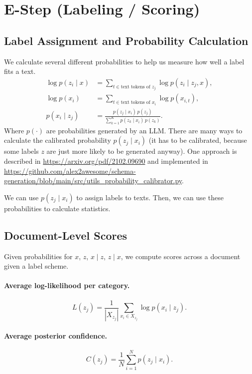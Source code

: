 \documentclass[11pt]{article}
\begin{document}
\section{E-Step (Labeling / Scoring)}

\subsection{Label Assignment and Probability Calculation}
We calculate several different probabilities to help us measure how well a label fits a text.
\begin{align}
\log p(z_i \mid x) &= \sum_{t \in \text{text tokens of } z_j} \log p(z_i \mid z_j, x), \tag{1} \\
\log p(x_i) &= \sum_{t \in \text{text tokens of } x_i} \log p(x_{i,t}), \tag{2} \\
p(x_i \mid z_j) &= \frac{p(z_j \mid x_i)\, p(z_j)}{\sum_{k=1}^K p(z_k \mid x_i)\, p(z_k)}. \tag{3}
\end{align}
Where $p(\cdot)$ are probabilities generated by an LLM. There are many ways to calculate the calibrated probability $p(z_j \mid x_i)$ (it has to be calibrated, because some labels $z$ are just more likely to be generated anyway). One approach is described in \url{https://arxiv.org/pdf/2102.09690} and implemented in \url{https://github.com/alex2awesome/schema-generation/blob/main/src/utils_probability_calibrator.py}.

We can use $p(z_j \mid x_i)$ to assign labels to texts. Then, we can use these probabilities to calculate statistics.

\subsection{Document-Level Scores}
Given probabilities for $x$, $z$, $x \mid z$, $z \mid x$, we compute scores across a document given a label scheme.

\paragraph{Average log-likelihood per category.}
\begin{equation}
L(z_j) = \frac{1}{|X_{z_j}|} \sum_{x_i \in X_{z_j}} \log p(x_i \mid z_j). \tag{4}
\end{equation}

\paragraph{Average posterior confidence.}
\begin{equation}
C(z_j) = \frac{1}{N} \sum_{i=1}^N p(z_j \mid x_i). \tag{5}
\end{equation}
\end{document}
